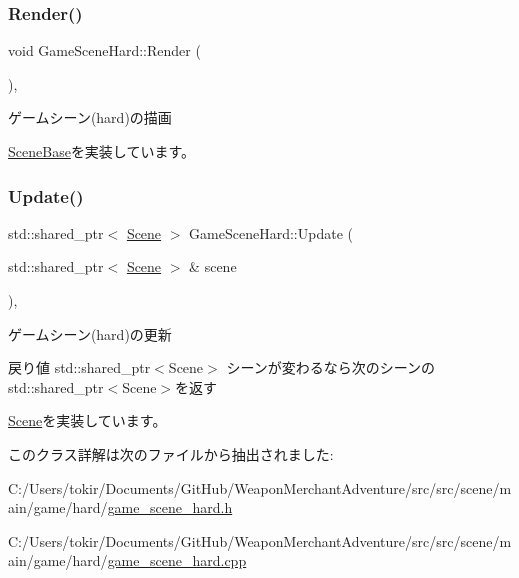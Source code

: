 \mbox{\label{class_game_scene_hard_ab4d10e5fc6e39746f80ef967d6a02eae}} 
\subsubsection{\texorpdfstring{Render()}{Render()}}
{\footnotesize\ttfamily void Game\+Scene\+Hard\+::\+Render (\begin{DoxyParamCaption}{ }\end{DoxyParamCaption})\hspace{0.3cm}{\ttfamily [final]}, {\ttfamily [virtual]}}



ゲームシーン(hard)の描画 



\mbox{\hyperlink{class_scene_base_ad981674ce731ea267f398e889bbb9dc3}{Scene\+Base}}を実装しています。

\mbox{\label{class_game_scene_hard_ac132a0e281a7d4e6b71deb6e5bcfdb9d}} 
\subsubsection{\texorpdfstring{Update()}{Update()}}
{\footnotesize\ttfamily std\+::shared\+\_\+ptr$<$ \mbox{\hyperlink{class_scene}{Scene}} $>$ Game\+Scene\+Hard\+::\+Update (\begin{DoxyParamCaption}\item[{std\+::shared\+\_\+ptr$<$ \mbox{\hyperlink{class_scene}{Scene}} $>$ \&}]{scene }\end{DoxyParamCaption})\hspace{0.3cm}{\ttfamily [final]}, {\ttfamily [virtual]}}



ゲームシーン(hard)の更新 

\begin{DoxyReturn}{戻り値}
std\+::shared\+\_\+ptr$<$\+Scene$>$ シーンが変わるなら次のシーンのstd\+::shared\+\_\+ptr$<$\+Scene$>$を返す 
\end{DoxyReturn}


\mbox{\hyperlink{class_scene_ab71ee5f19764b90c87b4574aa1cb1d25}{Scene}}を実装しています。



このクラス詳解は次のファイルから抽出されました\+:\begin{DoxyCompactItemize}
\item 
C\+:/\+Users/tokir/\+Documents/\+Git\+Hub/\+Weapon\+Merchant\+Adventure/src/src/scene/main/game/hard/\mbox{\hyperlink{game__scene__hard_8h}{game\+\_\+scene\+\_\+hard.\+h}}\item 
C\+:/\+Users/tokir/\+Documents/\+Git\+Hub/\+Weapon\+Merchant\+Adventure/src/src/scene/main/game/hard/\mbox{\hyperlink{game__scene__hard_8cpp}{game\+\_\+scene\+\_\+hard.\+cpp}}\end{DoxyCompactItemize}
